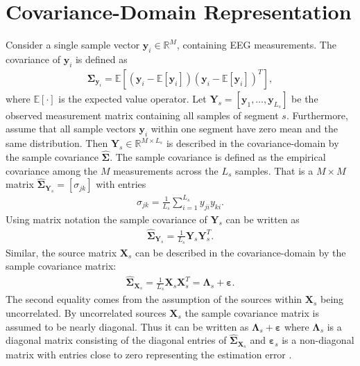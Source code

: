 \section{Covariance-Domain Representation}\label{sec:cov}
Consider a single sample vector $\textbf{y}_i\in \mathbb{R}^{M}$, containing EEG measurements. 
The covariance of $\mathbf{y}_i$ is defined as 
\begin{align*}
\boldsymbol{\Sigma}_{\mathbf{y}_i} = \mathbb{E}[(\mathbf{y}_i - \mathbb{E}[\mathbf{y}_i]) (\mathbf{y}_i - \mathbb{E}[\mathbf{y}_i])^T],
\end{align*}
where $\mathbb{E}[\cdot]$ is the expected value operator. 
Let $\mathbf{Y}_{s} = \left[\mathbf{y}_1, \dots, \mathbf{y}_{L_s}\right]$ be the observed measurement matrix containing all samples of segment $s$.
Furthermore, assume that all sample vectors $\mathbf{y}_i$ within one segment have zero mean and the same distribution.  
Then $\mathbf{Y}_s \in \mathbb{R}^{M \times L_s}$ is described in the covariance-domain by the sample covariance $\widehat{\boldsymbol{\Sigma}}$. 
The sample covariance is defined as the empirical covariance among the $M$ measurements across the $L_s$ samples. 
That is a $M \times M$ matrix $\widehat{\boldsymbol{\Sigma}}_{\mathbf{Y}_s} = [\sigma_{jk}]$ with entries 
\begin{align*}
\sigma_{jk} = \frac{1}{L_s} \sum_{i=1}^{L_s} y_{ji} y_{ki}.
\end{align*}
Using matrix notation the sample covariance of $\mathbf{Y}_s$ can be written as
\begin{align*}
\widehat{\boldsymbol{\Sigma}}_{\mathbf{Y}_s} = \frac{1}{L_s} \mathbf{Y}_s \mathbf{Y}_s^T.
\end{align*} 
Similar, the source matrix $\mathbf{X}_s$ can be described in the covariance-domain by the sample covariance matrix:
\begin{align*}
\widehat{\boldsymbol{\Sigma}}_{\mathbf{X}_s} = \frac{1}{L_s} \mathbf{X}_s \mathbf{X}_s^T = \boldsymbol{\Lambda}_s + \boldsymbol{\varepsilon}. 
\end{align*}
The second equality comes from the assumption of the sources within $\mathbf{X}_s$ being uncorrelated. 
By uncorrelated sources $\mathbf{X}_s$ the sample covariance matrix is assumed to be nearly diagonal. 
Thus it can be written as $\boldsymbol{\Lambda}_s + \boldsymbol{\varepsilon}$ where $\boldsymbol{\Lambda}_s$ is a diagonal matrix consisting of the diagonal entries of $\widehat{\boldsymbol{\Sigma}}_{\mathbf{X}_s}$ and $ \boldsymbol{\varepsilon}_s$ is a non-diagonal matrix with entries close to zero representing the estimation error \cite{Balkan2015}.

